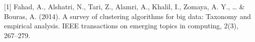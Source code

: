[1] Fahad, A., Alshatri, N., Tari, Z., Alamri, A., Khalil, I., Zomaya, A. Y., \ldots{} \& Bouras, A. (2014). A survey of clustering algorithms for big data: Taxonomy and empirical analysis. IEEE transactions on emerging topics in computing, 2(3), 267--279.
